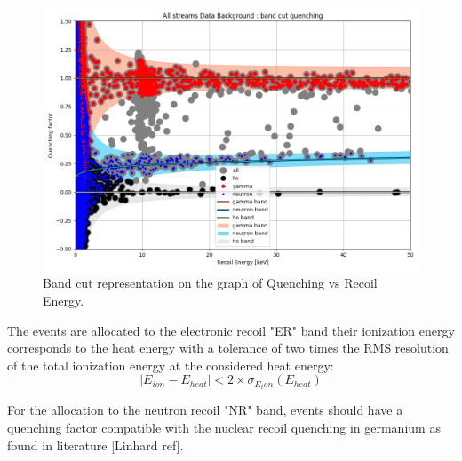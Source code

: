\begin{figure}
\centering
\includegraphics[width=\linewidth,]{Figures/Neutron/band_cut_quenching.png}
\caption{Band cut representation on the graph of Quenching vs Recoil Energy.}
\label{fig:band-cut-quenching}
\end{figure}

The events are allocated to the electronic recoil "ER" band their ionization energy corresponds to the heat energy with a tolerance of two times the RMS resolution of the total ionization energy at the considered heat energy:
\begin{equation}
|E_{ion} - E_{heat}| < 2 \times \sigma_{E_ion}\left( E_{heat}\right)
\end{equation}


For the allocation to the neutron recoil "NR" band, events should have a quenching factor compatible with the nuclear recoil quenching in germanium as found in literature [Linhard ref].










